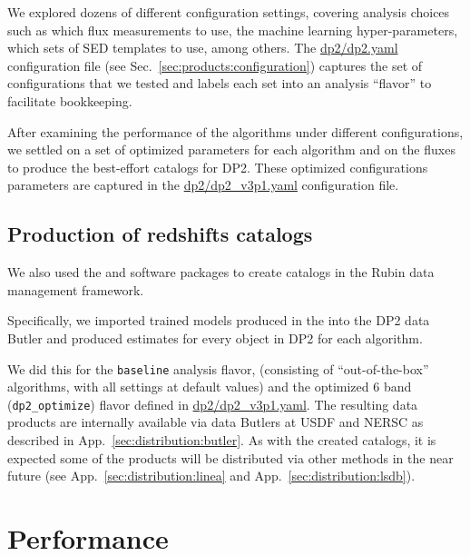 We explored dozens of different configuration settings, covering analysis choices such as which flux measurements to use, the machine learning hyper-parameters, which sets of SED templates to use, among others.   The \href{https://github.com/LSSTDESC/rail_project_config/blob/main/dp2/dp2.yaml}{dp2/dp2.yaml} configuration file (see Sec.~\ref{sec:products:configuration}) captures the set of configurations that we tested and labels each set into an analysis ``flavor'' to facilitate bookkeeping.

After examining the performance of the algorithms under different configurations, we settled on a set of optimized parameters for each algorithm and on the  fluxes to produce the best-effort catalogs for DP2.   These optimized configurations parameters are captured in the \href{https://github.com/LSSTDESC/rail_project_config/blob/main/dp2/dp2_v3p1.yaml}{dp2/dp2\_v3p1.yaml} configuration file.


\subsection{Production of redshifts catalogs}
\label{sec:method:redshift_catalogs}

We also used the \href{https://github.com/lsst-dm/meas_pz}{} and \href{https://github.com/lsst-dm/meas_pz}{} software packages
to create \photoz catalogs in the Rubin data management framework.

Specifically, we imported trained models produced in the  into the DP2 data Butler and produced \photoz estimates for every object in DP2 for each algorithm.

We did this for the \texttt{baseline} analysis flavor, (consisting of ``out-of-the-box'' algorithms, with all settings at default values) and the optimized 6 band (\texttt{dp2\_optimize}) flavor defined in \href{https://github.com/LSSTDESC/rail_project_config/blob/main/dp2/dp2_v3p1.yaml}{dp2/dp2\_v3p1.yaml}.
The resulting data products are internally available via data Butlers at USDF and NERSC as described in App.~\ref{sec:distribution:butler}.   As with the  created catalogs, it is expected some of the products will be distributed via other methods in the near future (see App.~\ref{sec:distribution:linea} and App.~\ref{sec:distribution:lsdb}).


\section{Performance}
\label{sec:performance:0}

